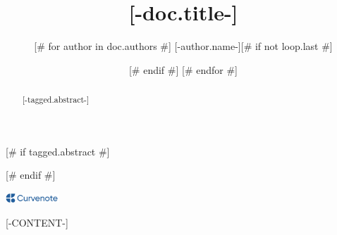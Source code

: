 \documentclass{article}
\title{[-doc.title-]}
\author{
[# for author in doc.authors #]
[-author.name-][# if not loop.last #] \and [# endif #]
[# endfor #]
}
\date{\displaydate{articleDate}}
\newcommand{\logo}{
  \href{[-doc.oxalink-]}{\includegraphics[width=2cm]{curvenote.png}}
}
\begin{document}
\maketitle

[# if tagged.abstract #]\begin{abstract}[-tagged.abstract-]\end{abstract}[# endif #]

\begin{center}\logo\end{center}

[-CONTENT-]


\end{document}
